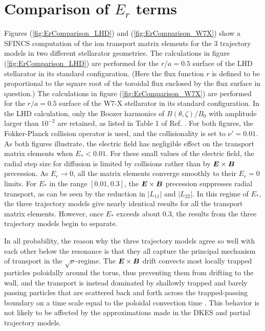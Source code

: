\documentclass[12pt]{revtex4}
\newcommand{\vect}[1]{\mbox{\boldmath $#1$}}
\begin{document}
\section{Comparison of $E_r$ terms}
\label{sec:ErComparison}

Figures (\ref{fig:ErComparison_LHD}) and (\ref{fig:ErComparison_W7X}) show a SFINCS computation of
the ion transport matrix elements for the 3 trajectory models
in two different stellarator geometries.
The calculations in figure (\ref{fig:ErComparison_LHD}) are performed for the $r/a=0.5$ surface of
the LHD stellarator \cite{LHD} in its standard configuration. (Here the flux function $r$ is defined to be proportional to the square root of the toroidal flux enclosed by the flux surface in question.)
The calculations in figure (\ref{fig:ErComparison_W7X}) are performed for the $r/a=0.5$ surface of
the W7-X stellarator \cite{W7X1,W7X2} in its standard configuration.
In the LHD calculation, only the Boozer harmonics of $B(\theta,\zeta)/B_0$ with amplitude larger than $10^{-2}$
are retained, as listed in Table 1 of Ref. \cite{BeidlerBigBenchmarking}.
For both figures, the Fokker-Planck collision operator is used, and the collisionality
is set to $\nu'=0.01$.
As both figures illustrate, the electric field has negligible
effect on the transport matrix elements when $E_* < 0.01$.
For these small values of the electric field, the radial step size for diffusion is 
limited by collisions rather than by $\vect{E}\times\vect{B}$ precession.
As $E_r \to 0$, all the matrix elements converge smoothly to their $E_r=0$ limits.
For $E_*$ in the range $[0.01, 0.3]$,
the $\vect{E}\times\vect{B}$ precession suppresses radial transport,
as can be seen by the reduction in $|L_{11}|$ and $|L_{22}|$. In this regime of $E_*$, the three trajectory models give nearly
identical results for all the transport matrix elements.
However, once $E_*$ exceeds about 0.3, the results from the three trajectory models
begin to separate. 

In all probability, the reason why the three trajectory models agree
so well with each other below the resonance is that they all capture
the principal mechanism of transport in the $\sqrt{\nu}$-regime. The
$\vect{E}\times\vect{B}$ drift convects most locally trapped particles
poloidally around the torus, thus preventing them from drifting to the
wall, and the transport is instead dominated by shallowly trapped and
barely passing particles that are scattered back and forth across the
trapped-passing boundary on a time scale equal to the poloidal
convection time \cite{HoKulsrud}. This behavior is not likely to be
affected by the approximations 
made in the DKES and partial trajectory models.
\end{document}
